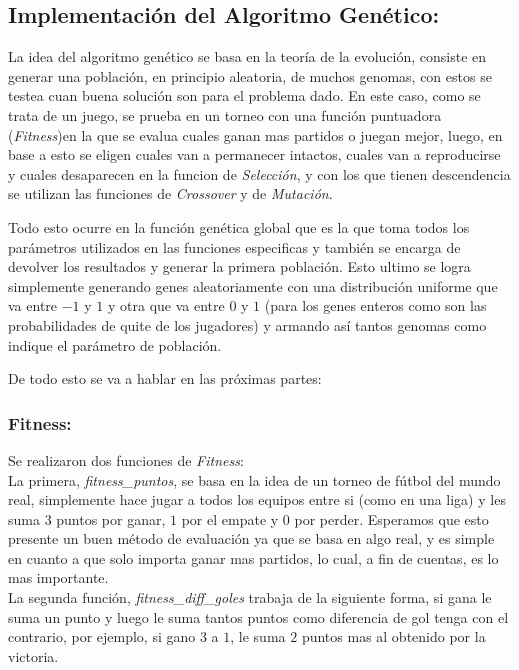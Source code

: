 \subsection{Implementación del Algoritmo Genético:}

La idea del algoritmo genético se basa en la teoría de la evolución, consiste en generar una población,
en principio aleatoria, de muchos genomas, con estos se testea cuan buena solución son para el problema dado.
En este caso, como se trata de un juego, se prueba en un torneo con una función puntuadora
(\emph{Fitness})en la que se evalua cuales ganan mas partidos o juegan mejor, luego, en base a esto se eligen cuales van a
permanecer intactos, cuales van a reproducirse y cuales desaparecen en la funcion de \emph{Selección}, y con los que tienen
 descendencia se utilizan las funciones de \emph{Crossover} y de \emph{Mutación}.


Todo esto ocurre en la función genética global que es la que toma todos los parámetros utilizados en las funciones especificas
y también se encarga de devolver los resultados y generar la primera población.
Esto ultimo se logra simplemente generando genes aleatoriamente con una distribución uniforme que va entre $-1$ y $1$
y otra que va entre $0$ y $1$ (para los genes enteros como son las probabilidades de quite de los jugadores) y armando
así tantos genomas como indique el parámetro de población.

De todo esto se va a hablar en las próximas partes:\\

\subsubsection{Fitness:}

Se realizaron dos funciones de \emph{Fitness}:\\


La primera, \emph{fitness\_puntos}, se basa en la idea de un torneo de fútbol del mundo real, simplemente hace jugar a todos
los equipos entre si (como en una liga) y les suma $3$ puntos por ganar, $1$ por el empate y $0$ por perder.
Esperamos que esto presente un buen método de evaluación ya que se basa en algo real, y es simple en cuanto a que solo importa ganar
mas partidos, lo cual, a fin de cuentas, es lo mas importante.\\

La segunda función, \emph{fitness\_diff\_goles} trabaja de la siguiente forma, si gana le suma un punto y luego le suma tantos
puntos como diferencia de gol tenga con el contrario, por ejemplo, si gano $3$ a $1$, le suma $2$ puntos mas al obtenido por
la victoria.

